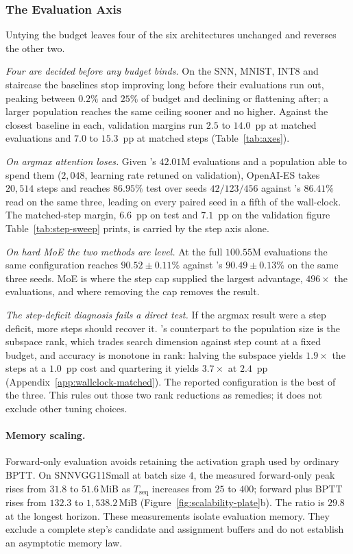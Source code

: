 \subsubsection{The Evaluation Axis}\label{sec:other-axes}

Untying the budget leaves four of the six architectures unchanged and reverses the
other two.

\emph{Four are decided before any budget binds.} On the SNN, MNIST, INT8 and staircase
the baselines stop improving long before their evaluations run out, peaking between
$0.2\%$ and $25\%$ of budget and declining or flattening after; a larger population
reaches the same ceiling sooner and no higher. Against the closest baseline in each,
validation margins run $2.5$ to $14.0$~pp at matched evaluations and $7.0$ to
$15.3$~pp at matched steps (Table~\ref{tab:axes}).

\emph{On argmax attention \sysname{} loses.} Given \sysname{}'s $42.01$M evaluations
and a population able to spend them ($2{,}048$, learning rate retuned on validation),
OpenAI-ES takes $20{,}514$ steps and reaches $86.95\%$ test over seeds $42/123/456$
against \sysname{}'s $86.41\%$ read on the same three, leading on every paired seed in a
fifth of the wall-clock. The matched-step margin, $6.6$~pp on test and $7.1$~pp on the
validation figure Table~\ref{tab:step-sweep} prints, is carried by the step axis alone.

\emph{On hard MoE the two methods are level.} At the full $100.55$M evaluations the
same configuration reaches $90.52\pm0.11\%$ against \sysname{}'s
$90.49\pm0.13\%$ on the same three seeds. MoE is where the
step cap supplied the largest advantage, $496\times$ the evaluations, and where
removing the cap removes the result.

\emph{The step-deficit diagnosis fails a direct test.} If the argmax result were a step
deficit, more steps should recover it. \sysname{}'s counterpart to the population size
is the subspace rank, which trades search dimension against step count at a fixed budget,
and accuracy is monotone in rank: halving the subspace yields $1.9\times$ the steps at a
$1.0$~pp cost and quartering it yields $3.7\times$ at $2.4$~pp
(Appendix~\ref{app:wallclock-matched}). The reported configuration is the best of the
three. This rules out those two rank reductions as remedies; it does not
exclude other tuning choices.

\paragraph{Memory scaling.}\label{sec:snn-memory}
Forward-only evaluation avoids retaining the activation graph used by
ordinary BPTT. On SNNVGG11Small at batch size $4$, the measured forward-only
peak rises from $31.8$ to $51.6$\,MiB as $T_{\mathrm{seq}}$ increases from
$25$ to $400$; forward plus BPTT rises from $132.3$ to $1{,}538.2$\,MiB
(Figure~\ref{fig:scalability-plate}b). The ratio is $29.8$ at the longest
horizon. These measurements isolate evaluation memory. They exclude a
complete \sysname{} step's candidate and assignment buffers and do not
establish an asymptotic memory law.

